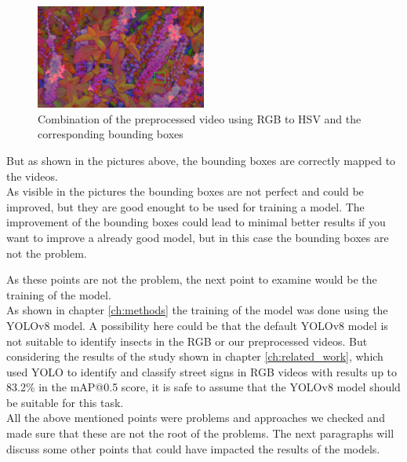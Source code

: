 \begin{figure}[h]
    \centering
    \includegraphics[width=0.5\textwidth]{images/bb_test_HSV.png}
    \caption{Combination of the preprocessed video using RGB to HSV and the corresponding bounding boxes}
\end{figure}

But as shown in the pictures above, the bounding boxes are correctly mapped to the videos. \\
As visible in the pictures the bounding boxes are not perfect and could be improved, but they are good enought to be used for training a model. The improvement of the bounding boxes could lead to minimal better results if you want to improve a already good model, but in this case the bounding boxes are not the problem.

As these points are not the problem, the next point to examine would be the training of the model. \\
As shown in chapter \ref{ch:methods} the training of the model was done using the YOLOv8 model. A possibility here could be that the default YOLOv8 model is not suitable to identify insects in the RGB or our preprocessed videos. But considering the results of the study shown in chapter \ref{ch:related_work}, which used YOLO to identify and classify street signs in RGB videos with results up to 83.2\% in the mAP@0.5 score, it is safe to assume that the YOLOv8 model should be suitable for this task. \\

All the above mentioned points were problems and approaches we checked and made sure that these are not the root of the problems. The next paragraphs will discuss some other points that could have impacted the results of the models.




